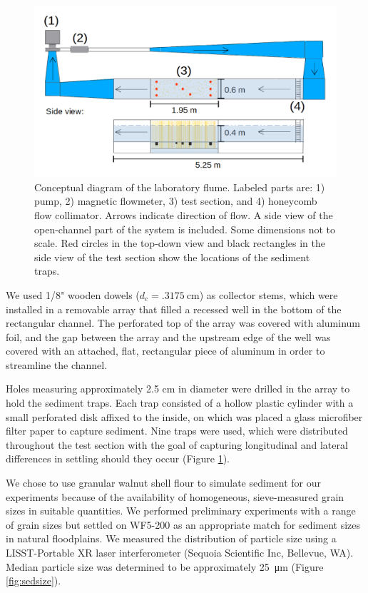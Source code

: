 \documentclass{scrreprt}
\begin{document}
\begin{figure}[htbp]
\includegraphics[width=15cm]{../pics/flume_with_sedtraps.png}
\centering
\caption{Conceptual diagram of the laboratory flume. Labeled parts are: 1) pump, 2) magnetic flowmeter, 3) test section, and 4) honeycomb flow collimator. Arrows indicate direction of flow. A side view of the open-channel part of the system is included. Some dimensions not to scale. Red circles in the top-down view and black rectangles in the side view of the test section show the locations of the sediment traps.}
\label{fig:floorplan}
\end{figure}

We used 1/8" wooden dowels ($d_c = \SI{.3175}{\centi\metre}$) as collector stems, which were installed in a removable array that filled a recessed well in the bottom of the rectangular channel. The perforated top of the array was covered with aluminum foil, and the gap between the array and the upstream edge of the well was covered with an attached, flat, rectangular piece of aluminum in order to streamline the channel. 

Holes measuring approximately 2.5 cm in diameter were drilled in the array to hold the sediment traps. Each trap consisted of a hollow plastic cylinder with a small perforated disk affixed to the inside, on which was placed a glass microfiber filter paper to capture sediment. Nine traps were used, which were distributed throughout the test section with the goal of capturing longitudinal and lateral differences in settling should they occur (Figure \ref{fig:floorplan}).

We chose to use granular walnut shell flour to simulate sediment for our experiments because of the availability of homogeneous, sieve-measured grain sizes in suitable quantities. We performed preliminary experiments with a range of grain sizes but settled on WF5-200 as an appropriate match for sediment sizes in natural floodplains. We measured the distribution of particle size using a LISST-Portable XR laser interferometer (Sequoia Scientific Inc, Bellevue, WA). Median particle size was determined to be approximately \SI{25}{\micro\metre} (Figure \ref{fig:sedsize}).
\end{document}
